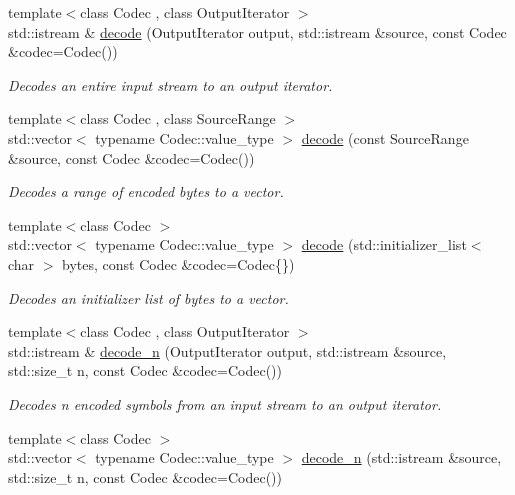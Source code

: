 \begin{DoxyCompactItemize}
{\footnotesize template$<$class Codec , class Output\+Iterator $>$ }\\std\+::istream \& \mbox{\hyperlink{namespaceirk_acce34441889b1a20715396eb4e4cb6b3}{decode}} (Output\+Iterator output, std\+::istream \&source, const Codec \&codec=Codec())
\begin{DoxyCompactList}\small\item\em Decodes an entire input stream to an output iterator. \end{DoxyCompactList}\item 
{\footnotesize template$<$class Codec , class Source\+Range $>$ }\\std\+::vector$<$ typename Codec\+::value\+\_\+type $>$ \mbox{\hyperlink{namespaceirk_a54aebb88cf4cd63c2d724bfbfee53435}{decode}} (const Source\+Range \&source, const Codec \&codec=Codec())
\begin{DoxyCompactList}\small\item\em Decodes a range of encoded bytes to a vector. \end{DoxyCompactList}\item 
{\footnotesize template$<$class Codec $>$ }\\std\+::vector$<$ typename Codec\+::value\+\_\+type $>$ \mbox{\hyperlink{namespaceirk_a939f0cf6fd86def4ef2d1035d61ff789}{decode}} (std\+::initializer\+\_\+list$<$ char $>$ bytes, const Codec \&codec=Codec\{\})
\begin{DoxyCompactList}\small\item\em Decodes an initializer list of bytes to a vector. \end{DoxyCompactList}\item 
{\footnotesize template$<$class Codec , class Output\+Iterator $>$ }\\std\+::istream \& \mbox{\hyperlink{namespaceirk_a9df7297fc361e7db737ef2f5d452b234}{decode\+\_\+n}} (Output\+Iterator output, std\+::istream \&source, std\+::size\+\_\+t n, const Codec \&codec=Codec())
\begin{DoxyCompactList}\small\item\em Decodes {\ttfamily n} encoded symbols from an input stream to an output iterator. \end{DoxyCompactList}\item 
{\footnotesize template$<$class Codec $>$ }\\std\+::vector$<$ typename Codec\+::value\+\_\+type $>$ \mbox{\hyperlink{namespaceirk_a37493e1aca6b08f1d85998653343e7a6}{decode\+\_\+n}} (std\+::istream \&source, std\+::size\+\_\+t n, const Codec \&codec=Codec())

\end{DoxyCompactItemize}
